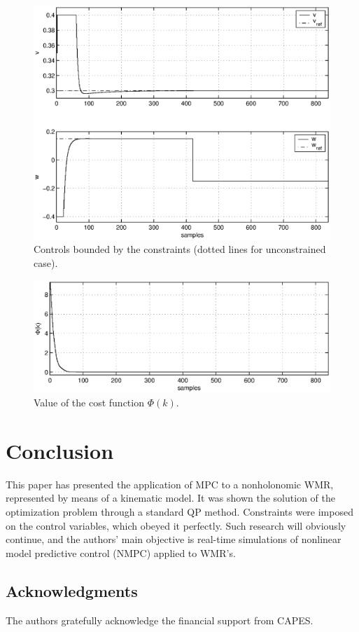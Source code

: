 \documentclass[twocolumn]{IEEEtran} %
\begin{document}
\begin{figure}
	\centering
	\includegraphics[width=.99\linewidth]{Figures/controls.eps}
	\caption{Controls bounded by the constraints (dotted lines for unconstrained case).}
	\label{fig:controls}
\end{figure}
\begin{figure}
	\centering
	\includegraphics[width=.99\linewidth]{Figures/cost.eps}
	\caption{Value of the cost function $\Phi(k)$.}
	\label{fig:cost}
\end{figure}


\section{Conclusion}\label{sec:conclusions}
This paper has presented the application of MPC to a nonholonomic WMR, represented by means of a kinematic model. It was shown the solution of the optimization problem through a standard QP method. Constraints were imposed on the control variables, which obeyed it perfectly. Such research will obviously continue, and the authors' main objective is real-time simulations of nonlinear model predictive control (NMPC) applied to WMR's.


\subsection*{Acknowledgments}
The authors gratefully acknowledge the financial support from CAPES.

\nocite{*}


\end{document}
